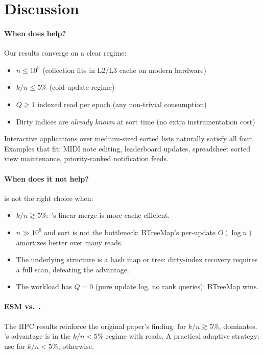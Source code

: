 \section{Discussion}
\label{sec:discussion}

\paragraph{When does \DeltaSort help?}
Our results converge on a clear regime:

\begin{itemize}
  \item $n \leq 10^5$ (collection fits in L2/L3 cache on modern hardware)
  \item $k/n \leq 5\%$ (cold update regime)
  \item $Q \geq 1$ indexed read per epoch (any non-trivial consumption)
  \item Dirty indices are \emph{already known} at sort time (no extra instrumentation cost)
\end{itemize}

Interactive applications over medium-sized sorted lists naturally satisfy all four.
Examples that fit: MIDI note editing, leaderboard updates, spreadsheet sorted
view maintenance, priority-ranked notification feeds.

\paragraph{When does it not help?}
\DeltaSort is not the right choice when:

\begin{itemize}
  \item $k/n \gtrsim 5\%$: \ESM's linear merge is more cache-efficient.
  \item $n \gg 10^6$ and sort is not the bottleneck: BTreeMap's per-update
    $O(\log n)$ amortizes better over many reads.
  \item The underlying structure is a hash map or tree: dirty-index recovery
    requires a full scan, defeating the advantage.
  \item The workload has $Q = 0$ (pure update log, no rank queries): BTreeMap wins.
\end{itemize}

\paragraph{ESM vs.\ \DeltaSort.}
The HPC results reinforce the original \DeltaSort paper's finding: for
$k/n \gtrsim 5\%$, \ESM dominates.
\DeltaSort's advantage is in the $k/n < 5\%$ regime with reads.
A practical adaptive strategy: use \DeltaSort for $k/n < 5\%$, \ESM otherwise.

